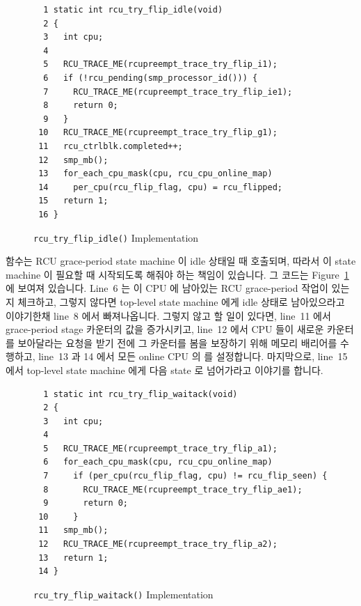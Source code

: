 \begin{figure}[tbp]
{ \scriptsize
\begin{verbatim}
  1 static int rcu_try_flip_idle(void)
  2 {
  3   int cpu;
  4
  5   RCU_TRACE_ME(rcupreempt_trace_try_flip_i1);
  6   if (!rcu_pending(smp_processor_id())) {
  7     RCU_TRACE_ME(rcupreempt_trace_try_flip_ie1);
  8     return 0;
  9   }
 10   RCU_TRACE_ME(rcupreempt_trace_try_flip_g1);
 11   rcu_ctrlblk.completed++;
 12   smp_mb();
 13   for_each_cpu_mask(cpu, rcu_cpu_online_map)
 14     per_cpu(rcu_flip_flag, cpu) = rcu_flipped;
 15   return 1;
 16 }
\end{verbatim}
}
\caption{{\tt rcu\_try\_flip\_idle()} Implementation}
\label{fig:app:rcuimpl:rcu_try_flip_idle() Implementation}
\end{figure}

 함수는 RCU grace-period state machine 이 idle 상태일
때 호출되며, 따라서 이 state machine 이 필요할 때 시작되도록 해줘야 하는 책임이
있습니다.
그 코드는
Figure~\ref{fig:app:rcuimpl:rcu_try_flip_idle() Implementation}
에 보여져 있습니다.
Line~6 는 이 CPU 에 남아있는 RCU grace-period 작업이 있는지 체크하고, 그렇지
않다면 top-level state machine 에게 idle 상태로 남아있으라고 이야기한채 line~8
에서 빠져나옵니다.
그렇지 않고 할 일이 있다면, line~11 에서 grace-period stage 카운터의 값을
증가시키고, line~12 에서 CPU 들이 새로운 카운터를 보아달라는 요청을 받기 전에
그 카운터를 봄을 보장하기 위해 메모리 배리어를 수행하고, line~13 과 14 에서
모든 online CPU 의  를 설정합니다.
마지막으로, line~15 에서 top-level state machine 에게 다음 state 로 넘어가라고
이야기를 합니다.

\begin{figure}[tbp]
{ \scriptsize
\begin{verbatim}
  1 static int rcu_try_flip_waitack(void)
  2 {
  3   int cpu;
  4
  5   RCU_TRACE_ME(rcupreempt_trace_try_flip_a1);
  6   for_each_cpu_mask(cpu, rcu_cpu_online_map)
  7     if (per_cpu(rcu_flip_flag, cpu) != rcu_flip_seen) {
  8       RCU_TRACE_ME(rcupreempt_trace_try_flip_ae1);
  9       return 0;
 10     }
 11   smp_mb();
 12   RCU_TRACE_ME(rcupreempt_trace_try_flip_a2);
 13   return 1;
 14 }
\end{verbatim}
}
\caption{{\tt rcu\_try\_flip\_waitack()} Implementation}
\label{fig:app:rcuimpl:rcu_try_flip_waitack() Implementation}
\end{figure}

